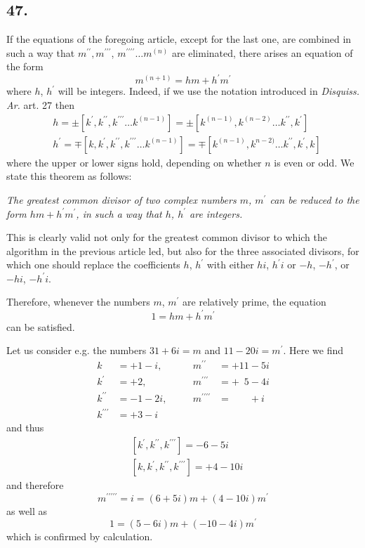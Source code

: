 \documentclass[twoside,12pt]{memoir}
\begin{document}
\subsection*{47.}

If the equations of the foregoing article, except for the last one, are combined in such a way that \(m^{\prime \prime}, m^{\prime \prime \prime}\), \(m^{\prime \prime \prime \prime} \ldots m^{(n)}\) are eliminated, there arises an equation of the form
\[m^{(n+1)}=h m+h^{\prime} m^{\prime}\]
where \(h\), \(h^{\prime}\) will be integers. Indeed, if we use the notation introduced in \textit{Disquiss. Ar.} art. 27 then
\[\begin{aligned}
& h= \pm\left[k^{\prime}, k^{\prime \prime}, k^{\prime \prime \prime} \ldots k^{(n-1)}\right]= \pm\left[k^{(n-1)}, k^{(n-2)} \ldots k^{\prime \prime}, k^{\prime}\right] \\
& h^{\prime}=\mp\left[k, k^{\prime}, k^{\prime \prime}, k^{\prime \prime \prime} \ldots k^{(n-1)}\right]=\mp\left[k^{(n-1)}, k^{n-2)} \ldots k^{\prime \prime}, k^{\prime}, k\right]
\end{aligned}\]
where the upper or lower signs hold, depending on whether \(n\) is even or odd. We state this theorem as follows:

\textit{The greatest common divisor of two complex numbers \(m\), \(m^{\prime}\) can be reduced to the form \(h m+h^{\prime} m^{\prime}\), in such a way that \(h\), \(h^{\prime}\) are integers.}
%

This is clearly valid not only for the greatest common divisor to which the algorithm in the previous article led, but also for the three associated divisors, for which one should replace the coefficients \(h\), \(h^{\prime}\) with either \(hi\), \(h^{\prime}i\) or \(-h\), \(-h^{\prime}\), or \(-hi\), \(-h^{\prime}i\).

Therefore, whenever the numbers \(m\), \(m^{\prime}\) are relatively prime, the equation
\[1 = hm + h^{\prime}m^{\prime}\]
can be satisfied.
%

Let us consider e{.}g{.} the numbers \(31+6i=m\) and \(11-20i=m^{\prime}\). Here we find
\[\begin{array}{clccl}
k&=+1-i, &\quad& m^{\prime \prime}&=+11-5i \\
k^{\prime}&=+2, &\quad& m^{\prime \prime \prime}&=+\phantom{0}5-4i \\
k^{\prime \prime}&=-1-2i, &\quad& m^{\prime \prime \prime \prime}&=\phantom{+00}+i \\
k^{\prime \prime \prime}&=+3-i &\quad&
\end{array}\]
and thus
\[\begin{aligned}
& {\left[k^{\prime}, k^{\prime \prime}, k^{\prime \prime \prime}\right]=-6-5i} \\
& {\left[k, k^{\prime}, k^{\prime \prime}, k^{\prime \prime \prime}\right]=+4-10i}
\end{aligned}\]
and therefore
\[m^{\prime \prime \prime \prime \prime}=i=(6+5i)m+(4-10i)m^{\prime}\]
as well as
\[1=(5-6i)m+(-10-4i)m^{\prime}\]
which is confirmed by calculation.
\end{document}
